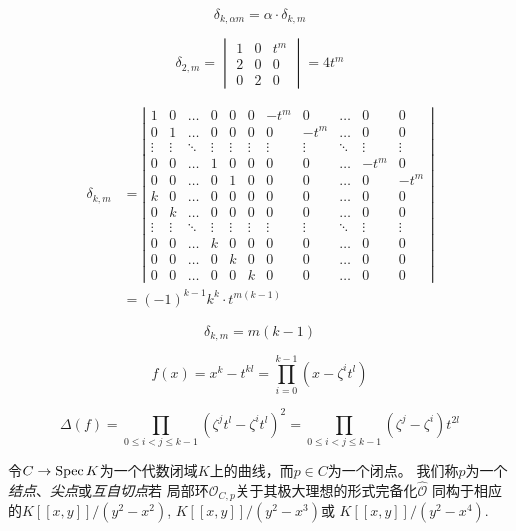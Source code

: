 \[
    \delta_{k, \alpha m}=\alpha \cdot \delta_{k, m}
\]

\[
    \delta_{2, m}=\begin{vmatrix}
        1 & 0 & t^m \\
        2 & 0 & 0 \\
        0 & 2 & 0
    \end{vmatrix}=4 t^m
\]

\[
    \begin{aligned}
        \delta_{k, m} & =\left|\begin{array}{ccccccccccc}
        1 & 0 & \ldots & 0 & 0 & 0 & -t^m & 0 & \ldots & 0 & 0 \\
        0 & 1 & \ldots & 0 & 0 & 0 & 0 & -t^m & \ldots & 0 & 0 \\
        \vdots & \vdots & \ddots & \vdots & \vdots & \vdots & \vdots & \vdots & \ddots & \vdots & \vdots \\
        0 & 0 & \ldots & 1 & 0 & 0 & 0 & 0 & \ldots & -t^m & 0 \\
        0 & 0 & \ldots & 0 & 1 & 0 & 0 & 0 & \ldots & 0 & -t^m \\
        k & 0 & \ldots & 0 & 0 & 0 & 0 & 0 & \ldots & 0 & 0 \\
        0 & k & \ldots & 0 & 0 & 0 & 0 & 0 & \ldots & 0 & 0 \\
        \vdots & \vdots & \ddots & \vdots & \vdots & \vdots & \vdots & \vdots & \ddots & \vdots & \vdots \\
        0 & 0 & \ldots & k & 0 & 0 & 0 & 0 & \ldots & 0 & 0 \\
        0 & 0 & \ldots & 0 & k & 0 & 0 & 0 & \ldots & 0 & 0 \\
        0 & 0 & \ldots & 0 & 0 & k & 0 & 0 & \ldots & 0 & 0
        \end{array}\right| \\
        & =(-1)^{k-1} k^k \cdot t^{m(k-1)}
        \end{aligned}
\]

\[
    \delta_{k, m}=m(k-1)
\]

\[
    f(x)=x^k-t^{k l}=\prod_{i=0}^{k-1}(x-\zeta^i t^l)
\]

\[
    \Delta(f)=\prod_{0 \leq i<j \leq k-1}(\zeta^j t^l-\zeta^i t^l)^2=\prod_{0 \leq i<j \leq k-1}(\zeta^j-\zeta^i) t^{2 l}
\]

\begin{defi}\label{defi:5.31}
    令$C\to \operatorname{Spec} K$为一个代数闭域$K$上的曲线，而$p\in C$为一个闭点。
    我们称$p$为一个\textit{结点}、\textit{尖点}或\textit{互自切点}若
    局部环$\mathscr O_{C,p}$关于其极大理想的形式完备化$\hat{\mathscr O}$
    同构于相应的$K[\![x,y]\!]/(y^2-x^2)$, $K[\![x,y]\!]/(y^2-x^3)$或
    $K[\![x,y]\!]/(y^2-x^4)$.
\end{defi}